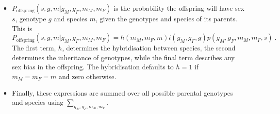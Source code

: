 \documentclass[11pt,a4paper]{article}
\begin{document}
\begin{itemize}
\item $P_{\mathrm{offspring}}(s, g, m | g_{M}, g_{F}, m_{M}, m_{F})$ is the probability the offspring will have sex $s$, genotype $g$ and species $m$, given the genotypes and species of its parents.  This is
\begin{equation}
P_{\mathrm{offspring}}(s, g, m | g_{M}, g_{F}, m_{M}, m_{F}) = h(m_{M}, m_{F}, m)i(g_{M}, g_{F}, g)p(g_{M}, g_{F}, m_{M}, m_{F}, s) \ .
\end{equation}
The first term, $h$, determines the hybridisation between species, the second determines the inheritance of genotypes, while the final term describes any sex bias in the offspring.  The hybridisation defaults to $h=1$ if $m_{M}=m_{F}=m$ and zero otherwise.  
\item Finally, these expressions are summed over all possible parental genotypes and species using $\sum_{g_{M}, g_{F}, m_{M}, m_{F}}$.
\end{itemize}
\end{document}
